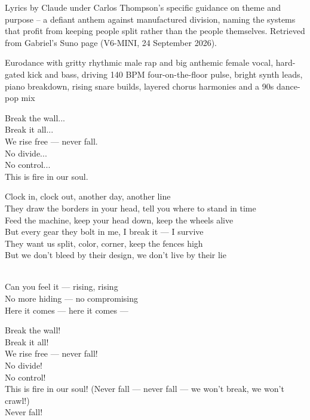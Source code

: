 
\label{sec:never-fall}
\begin{notes}
Lyrics by Claude under Carlos Thompson's specific guidance on theme and purpose -- a defiant anthem against manufactured division, naming the systems that profit from keeping people split rather than the people themselves. Retrieved from Gabriel's Suno page (V6-MINI, 24 September 2026).
\end{notes}
\begin{style}
Eurodance with gritty rhythmic male rap and big anthemic female vocal, hard-gated kick and bass, driving 140 BPM four-on-the-floor pulse, bright synth leads, piano breakdown, rising snare builds, layered chorus harmonies and a 90s dance-pop mix
\end{style}
\begin{lyrics}
Break the wall...\\
Break it all...\\
We rise free — never fall.\\
No divide...\\
No control...\\
This is fire in our soul.

Clock in, clock out, another day, another line\\
They draw the borders in your head, tell you where to stand in time\\
Feed the machine, keep your head down, keep the wheels alive\\
But every gear they bolt in me, I break it — I survive\\
They want us split, color, corner, keep the fences high\\
But we don't bleed by their design, we don't live by their lie

\\
Can you feel it — rising, rising\\
No more hiding — no compromising\\
Here it comes — here it comes —


Break the wall!\\
Break it all!\\
We rise free — never fall!\\
No divide!\\
No control!\\
This is fire in our soul!
(Never fall — never fall — we won't break, we won't crawl!)\\
Never fall!


\end{lyrics}
